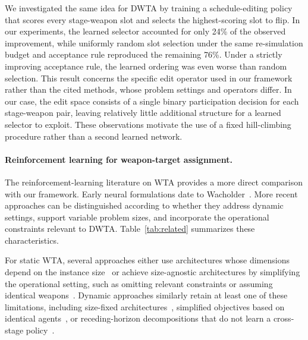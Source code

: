 We investigated the same idea for DWTA by training a schedule-editing policy that scores every stage-weapon slot and selects the highest-scoring slot to flip. In our experiments, the learned selector accounted for only 24\% of the observed improvement, while uniformly random slot selection under the same re-simulation budget and acceptance rule reproduced the remaining 76\%. Under a strictly improving acceptance rule, the learned ordering was even worse than random selection. This result concerns the specific edit operator used in our framework rather than the cited methods, whose problem settings and operators differ. In our case, the edit space consists of a single binary participation decision for each stage-weapon pair, leaving relatively little additional structure for a learned selector to exploit. These observations motivate the use of a fixed hill-climbing procedure rather than a second learned network.

\paragraph{Reinforcement learning for weapon-target assignment.}
The reinforcement-learning literature on WTA provides a more direct comparison with our framework. Early neural formulations date to Wacholder~\cite{wacholder1989neural}. More recent approaches can be distinguished according to whether they address dynamic settings, support variable problem sizes, and incorporate the operational constraints relevant to DWTA. Table~\ref{tab:related} summarizes these characteristics.

For static WTA, several approaches either use architectures whose dimensions depend on the instance size~\cite{meng2021deep,shin2020mean,gaudet2023} or achieve size-agnostic architectures by simplifying the operational setting, such as omitting relevant constraints or assuming identical weapons~\cite{luo2021learning,na2023weapon,vinyals2015pointer}. Dynamic approaches similarly retain at least one of these limitations, including size-fixed architectures~\cite{wu2022dynamic}, simplified objectives based on identical agents~\cite{hu2024}, or receding-horizon decompositions that do not learn a cross-stage policy~\cite{zhang2020efficient,zhang2020dynamic}.

